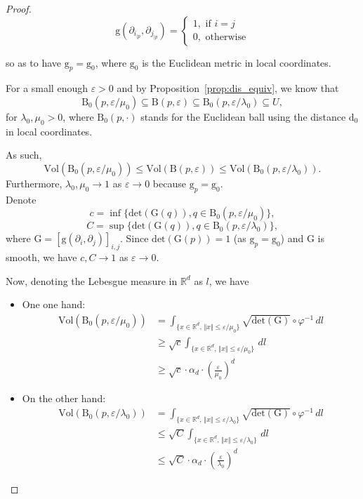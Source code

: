 \documentclass[pdflatex,sn-mathphys-ay]{sn-jnl}%
\newcommand{\dis}{\mathrm{d}}
\newcommand{\ball}{{\mathrm {B}}}
\newcommand{\vol}{\mathrm{Vol}}
\newcommand{\g}{\mathrm{g}}
\newcommand{\G}{\mathrm{G}}
\newcommand{\deter}{\mathrm{det}}
\newcommand{\R}{\mathbb{R}}
\newcommand{\eps}{\varepsilon}
\theoremstyle{thmstyleone}%
\begin{document}
\begin{appendices}
\begin{proof}
$$\g(\partial_{i_{|p}},\partial_{j_{|p}})=
\begin{cases}
1, \text{ if } i=j\\
0, \text{ otherwise}
\end{cases}$$

so as to have $\g_p=\g_0$, where $\g_0$ is the Euclidean metric in local coordinates.

For a small enough $\eps>0$ and by Proposition~\ref{prop:dis_equiv}, we know that 
$$\ball_0(p,\eps/\mu_0)\subseteq\ball(p,\eps)\subseteq \ball_0(p,\eps/\lambda_0)\subseteq U,$$
for $\lambda_0,\mu_0>0$, where $\ball_0(p,\cdot)$ stands for the Euclidean ball using the distance $\dis_0$ in local coordinates.

As such,
$$\vol\left(\ball_0(p,\eps/\mu_0)\right)\leq \vol\left(\ball(p,\eps)\right)\leq \vol\left(\ball_0(p,\eps/\lambda_0)\right).$$
Furthermore, $\lambda_0,\mu_0\rightarrow 1$ as $\eps\rightarrow 0$ because $\g_p=\g_0$.\\
Denote
$$c=\inf\{\deter(\G(q)),q\in\ball_0(p,\eps/\mu_0)\},$$
$$C=\sup\{\deter(\G(q)),q\in\ball_0(p,\eps/\lambda_0)\},$$
where $\G=\left[\g(\partial_i,\partial_j)\right]_{i,j}$.
Since $\deter(\G(p))=1$ (as $\g_p=\g_0$) and $\G$ is smooth, we have $c,C\rightarrow 1$ as $\eps\rightarrow 0$.

Now, denoting the Lebesgue measure in $\R^d$ as $l$, we have
\begin{itemize}
\item One one hand: \begin{align*}
\vol\left(\ball_0(p,\eps/\mu_0)\right)&=\int_{\{x\in\R^d,\,\Vert x\Vert\leq \eps/\mu_0\}}\sqrt{\deter(\G)}\circ\varphi^{-1}\,dl\\
&\geq \sqrt{c}\int_{\{x\in\R^d,\,\Vert x\Vert\leq \eps/\mu_0\}}\,dl\\
&\geq \sqrt{c}\cdot\alpha_d\cdot \left(\frac{\eps}{\mu_0}\right)^d
\end{align*}

\item On the other hand:\begin{align*}
\vol\left(\ball_0(p,\eps/\lambda_0)\right)&=\int_{\{x\in\R^d,\,\Vert x\Vert\leq \eps/\lambda_0\}}\sqrt{\deter(\G)}\circ\varphi^{-1}\,dl\\
&\leq \sqrt{C}\int_{\{x\in\R^d,\,\Vert x\Vert\leq \eps/\lambda_0\}}\,dl\\
&\leq \sqrt{C}\cdot \alpha_d\cdot \left(\frac{\eps}{\lambda_0}\right)^d
\end{align*}
\end{itemize}


\end{proof}
\end{appendices}
\end{document}
